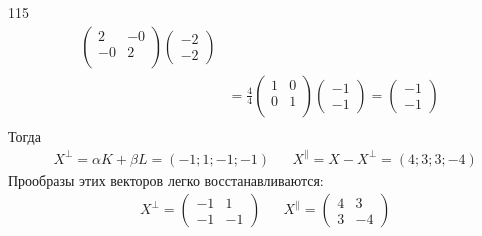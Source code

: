 \documentclass[12pt,a4paper]{article}
\begin{document}
\begin{problem}{115}
\begin{align*}
            \begin{pmatrix}
                2& -0\\
                -0& 2\\
            \end{pmatrix}
            \begin{pmatrix}
                -2\\
                -2
            \end{pmatrix}\\
            &=\frac{4}{4}
            \begin{pmatrix}
                1& 0\\
                0& 1\\
            \end{pmatrix}
            \begin{pmatrix}
                -1\\
                -1
            \end{pmatrix}
            =
            \begin{pmatrix}
                -1\\ -1
            \end{pmatrix}\\
        \end{align*}
        Тогда
        \begin{align*}
            &X^\perp = \alpha K + \beta L = (-1; 1; -1; -1)&
            &X^\parallel = X - X^\perp = (4; 3; 3; -4)
        \end{align*}
        Прообразы этих векторов легко восстанавливаются:
        \begin{align*}
            &X^\perp =
            \begin{pmatrix}
                -1& 1\\
                -1& -1
            \end{pmatrix}&
            &X^\parallel =
            \begin{pmatrix}
                4& 3\\
                3& -4
            \end{pmatrix}
        \end{align*}
    \end{problem}
\end{document}
